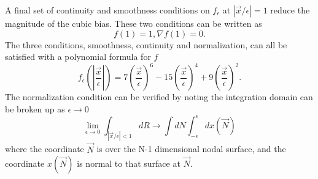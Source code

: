 \documentclass[twocolumn]{revtex4-1}
\begin{document}
A final set of continuity and smoothness conditions on $f_\epsilon$ at $|\vec{x}/\epsilon| = 1$ reduce the magnitude of the cubic bias.
These two conditions can be written as 
$$
f(1) = 1, \nabla f(1) = 0.
$$
The three conditions, smoothness, continuity and normalization, can all be satisfied with a polynomial formula for $f$
$$
f_\epsilon(|\frac{\vec{x}}{\epsilon}|) = 7(\frac{\vec{x}}{\epsilon})^6 - 15(\frac{\vec{x}}{\epsilon})^4 + 9(\frac{\vec{x}}{\epsilon})^2.
$$
The normalization condition can be verified by noting the integration domain can be broken up as $\epsilon \rightarrow 0$
$$
\lim_{\epsilon\rightarrow 0} \int_{|\vec{x}/\epsilon|< 1}  dR  \rightarrow \int dN \int_{-\epsilon}^{\epsilon} dx(\vec{N})
$$
where the coordinate $\vec{N}$ is over the N-1 dimensional nodal surface, and the coordinate $x(\vec{N})$ is normal to that surface at $\vec{N}$.
\end{document}
